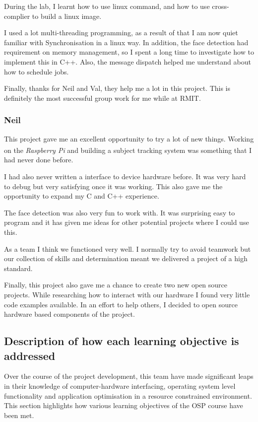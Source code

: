 \documentclass[11pt,a4paper,titlepage]{report}
\newcommand{\rpi}{\textit{Raspberry Pi\textsuperscript{\textregistered}}}
\begin{document}
During the lab, I learnt how to use linux command, and how to use cross-complier to build a linux image.

I used a lot multi-threading programming, as a result of that I am now quiet familiar with Synchronisation in a linux way. In addition, the face detection had requirement on memory management, so I spent a long time to investigate how to implement this in C++. Also, the message dispatch helped me understand about how to schedule jobs.

Finally, thanks for Neil and Val, they help me a lot in this project. This is definitely the most successful group work for me while at RMIT.


\subsubsection{Neil}

This project gave me an excellent opportunity to try a lot of new things. Working on the \rpi\xspace and building a subject tracking system was something that I had never done before.


I had also never written a interface to device hardware before. It was very hard to debug but very satisfying once it was working. This also gave me the opportunity to expand my C and C++ experience.

The face detection was also very fun to work with. It was surprising easy to program and it has given me ideas for other potential projects where I could use this.


As a team I think we functioned very well. I normally try to avoid teamwork but our collection of skills and determination meant we delivered a project of a high standard.


Finally, this project also gave me a chance to create two new open source projects. While researching how to interact with our hardware I found very little code examples available. In an effort to help others, I decided to open source hardware based components of the project.


\subsection{Description of how each learning objective is addressed}


Over the course of the project development, this team have made significant leaps in their knowledge of computer-hardware interfacing, operating system level functionality and application optimisation in a resource constrained environment. This section highlights how various learning objectives of the OSP course have been met.
 
\end{document}
